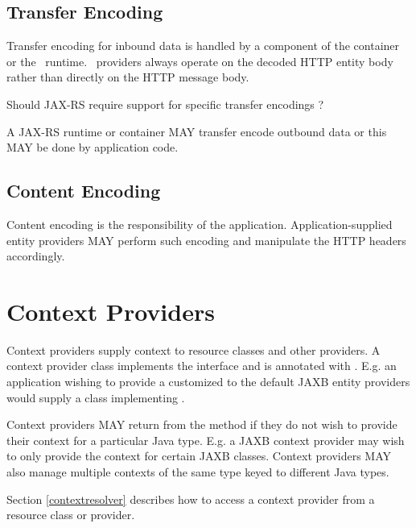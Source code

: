 \subsection{Transfer Encoding}

Transfer encoding for inbound data is handled by a component of the container or the \jaxrs\ runtime. \MsgRead\ providers always operate on the decoded HTTP entity body rather than directly on the HTTP message body.

\begin{ednote}Should JAX-RS require support for specific transfer encodings ?\end{ednote}

A JAX-RS runtime or container MAY transfer encode outbound data or this MAY be done by application code.

\subsection{Content Encoding}

Content encoding is the responsibility of the application. Application-supplied entity providers MAY perform such encoding and manipulate the HTTP headers accordingly.

\section{Context Providers}
\label{contextprovider}

Context providers supply context to resource classes and other providers. A context provider class implements the  interface and is annotated with \Provider. E.g. an application wishing to provide a customized  to the default JAXB entity providers would supply a class implementing .

Context providers MAY return  from the  method if they do not wish to provide their context for a particular Java type. E.g. a JAXB context provider may wish to only provide the context for certain JAXB classes. Context providers MAY also manage multiple contexts of the same type keyed to different Java types.

Section \ref{contextresolver} describes how to access a context provider from a resource class or provider.